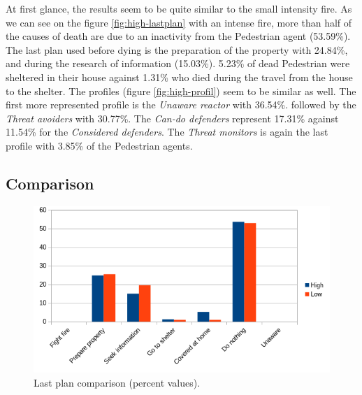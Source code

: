 \documentclass[12pt, a4paper]{memoir} %
\begin{document}
		At first glance, the results seem to be quite similar to the small intensity fire.
		As we can see on the figure \ref{fig:high-lastplan} with an intense fire, more than half of the causes of death are due to an inactivity from the
		Pedestrian agent (53.59\%). The last plan used before dying is the preparation of the property with 24.84\%, and during the research of information (15.03\%).
		5.23\% of dead Pedestrian were sheltered in their house against 1.31\% who died during the travel from the house to the shelter.
		\newline
		The profiles (figure \ref{fig:high-profil}) seem to be similar as well. The first more represented profile is the \textit{Unaware reactor} with 36.54\%.
		followed by the \textit{Threat avoiders} with 30.77\%. The \textit{Can-do defenders} represent 17.31\% against 11.54\% for the \textit{Considered defenders}.
		The \textit{Threat monitors} is again the last profile with 3.85\% of the Pedestrian agents.

		\subsection{Comparison}

		\begin{figure}
			\begin{center}
				\includegraphics[scale=0.6]{last-plan-comparison.png}
				\caption{\label{fig:last-plan-comparison}Last plan comparison (percent values).}
			\end{center}
		\end{figure}
\end{document}
